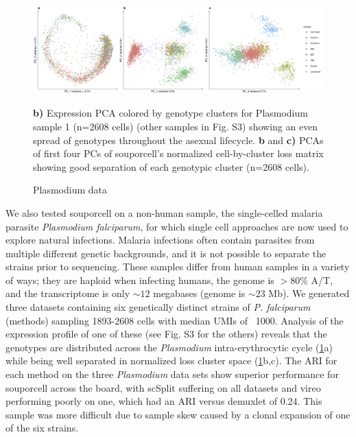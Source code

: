 \begin{figure}[htbp!]
\caption{Plasmodium data}
\label{figure:malaria}
\begin{centering}

\includegraphics[width=\textwidth]{malaria.jpg} 
\par{\textbf{b)} Expression PCA colored by genotype clusters for Plasmodium sample 1 (n=2608 cells) (other samples in Fig. S3) showing an even spread of genotypes throughout the asexual lifecycle. \textbf{b} and \textbf{c)} PCAs of first four PCs of souporcell's normalized cell-by-cluster loss matrix showing good separation of each genotypic cluster (n=2608 cells).}

\end{centering}
\end{figure}

\par{
We also tested souporcell on a non-human sample, the single-celled malaria parasite \textit{Plasmodium falciparum}, for which single cell approaches are now used to explore natural infections\cite{MCA}. Malaria infections often contain parasites from multiple different genetic backgrounds, and it is not possible to separate the strains prior to sequencing. These samples differ from human samples in a variety of ways; they are haploid when infecting humans, the genome is $>80$\% A/T, and the transcriptome is only $\sim12$ megabases (genome is $\sim23$ Mb). We generated three datasets containing six genetically distinct strains of \textit{P. falciparum} (methods) sampling 1893-2608 cells with median UMIs of ~1000. Analysis of the expression profile of one of these (see Fig. S3 for the others) reveals that the genotypes are distributed across the \textit{Plasmodium} intra-erythrocytic cycle (\ref{figure:malaria}a) while being well separated in normalized loss cluster space (\ref{figure:malaria}b,c). The ARI for each method on the three \textit{Plasmodium} data sets show superior performance for souporcell across the board, with scSplit suffering on all datasets and vireo performing poorly on one, which had an ARI versus demuxlet of 0.24. This sample was more difficult due to sample skew caused by a clonal expansion of one of the six strains.
} \\

